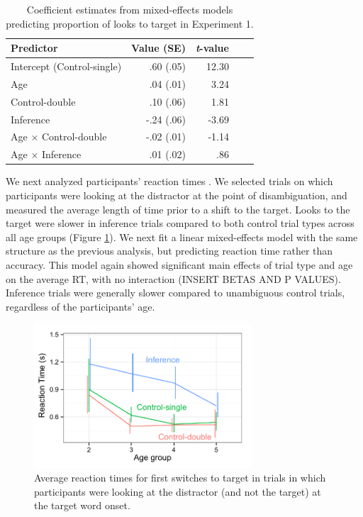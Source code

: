 \documentclass[10pt,letterpaper]{article}
\begin{document}
\begin{table}[t]
\caption{\label{tab:lmer1}  Coefficient estimates from mixed-effects models predicting proportion of looks to target in Experiment 1.} 
\begin{center} 
\begin{tabular}{l r r r l} 
\hline
Predictor  &  Value (SE) & \emph{t}-value\\
\hline
Intercept (Control-single)  & .60 (.05) & 12.30 \\
Age & .04 (.01) &  3.24 \\
Control-double & .10 (.06) & 1.81 \\
Inference & -.24 (.06) & -3.69 \\
Age $\times$ Control-double & -.02 (.01) & -1.14 \\
Age $\times$ Inference & .01 (.02) & .86 \\
\hline
\end{tabular} 
\end{center} 
\end{table}

We next analyzed participants' reaction times \cite{fernald2008looking}. We selected trials on which participants were looking at the distractor at the point of disambiguation, and measured the average length of time prior to a shift to the target. Looks to the target were slower in inference trials compared to both control trial types across all age groups (Figure \ref{fig:rt}). We next fit a linear mixed-effects model with the same structure as the previous analysis, but predicting reaction time rather than accuracy. This model again showed significant main effects of trial type and age on the average RT, with no interaction (INSERT BETAS AND P VALUES). Inference trials were generally slower compared to unambiguous control trials, regardless of the participants' age. 

\begin{figure}
\begin{centering} 
\includegraphics[width=3.2in]{figures/expt1-rt.pdf}
\caption{\label{fig:rt} Average reaction times for first switches to target in trials in which participants were looking at the distractor (and not the target) at the target word onset.}
\end{centering} 
\end{figure}
\end{document}
